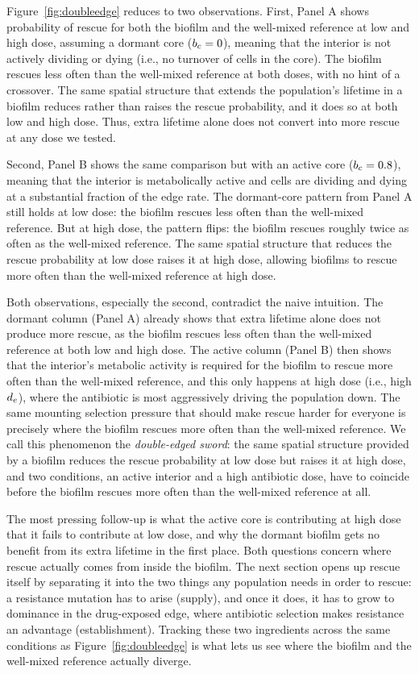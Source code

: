 Figure~\ref{fig:doubleedge} reduces to two observations. First, Panel A shows probability of rescue for both the biofilm and the well-mixed reference at low and high dose, assuming a dormant core ($b_c = 0$), meaning that the interior is not actively dividing or dying (i.e., no turnover of cells in the core). The biofilm rescues less often than the well-mixed reference at both doses, with no hint of a crossover. The same spatial structure that extends the population's lifetime in a biofilm reduces rather than raises the rescue probability, and it does so at both low and high dose. Thus, extra lifetime alone does not convert into more rescue at any dose we tested.

Second, Panel B shows the same comparison but with an active core ($b_c = 0.8$), meaning that the interior is metabolically active and cells are dividing and dying at a substantial fraction of the edge rate. The dormant-core pattern from Panel A still holds at low dose: the biofilm rescues less often than the well-mixed reference. But at high dose, the pattern flips: the biofilm rescues roughly twice as often as the well-mixed reference. The same spatial structure that reduces the rescue probability at low dose raises it at high dose, allowing biofilms to rescue more often than the well-mixed reference at high dose.

Both observations, especially the second, contradict the naive intuition. The dormant column (Panel A) already shows that extra lifetime alone does not produce more rescue, as the biofilm rescues less often than the well-mixed reference at both low and high dose. The active column (Panel B) then shows that the interior's metabolic activity is required for the biofilm to rescue more often than the well-mixed reference, and this only happens at high dose (i.e., high $d_e$), where the antibiotic is most aggressively driving the population down. The same mounting selection pressure that should make rescue harder for everyone is precisely where the biofilm rescues more often than the well-mixed reference. We call this phenomenon the \emph{double-edged sword}: the same spatial structure provided by a biofilm reduces the rescue probability at low dose but raises it at high dose, and two conditions, an active interior and a high antibiotic dose, have to coincide before the biofilm rescues more often than the well-mixed reference at all.

The most pressing follow-up is what the active core is contributing at high dose that it fails to contribute at low dose, and why the dormant biofilm gets no benefit from its extra lifetime in the first place. Both questions concern where rescue actually comes from inside the biofilm. The next section opens up rescue itself by separating it into the two things any population needs in order to rescue: a resistance mutation has to arise (supply), and once it does, it has to grow to dominance in the drug-exposed edge, where antibiotic selection makes resistance an advantage (establishment). Tracking these two ingredients across the same conditions as Figure~\ref{fig:doubleedge} is what lets us see where the biofilm and the well-mixed reference actually diverge.
